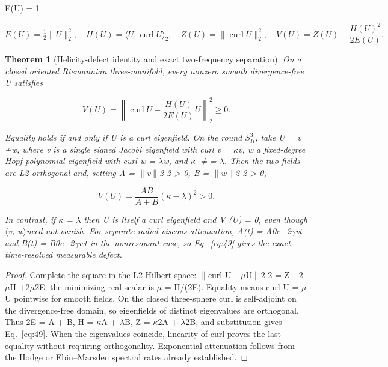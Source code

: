 \documentclass[10pt,letterpaper]{article}
\newtheorem{theorem}{Theorem}[section]
\theoremstyle{remark}
\begin{document}
E(U) = 1



\begin{equation}
\tag{47}\label{eq:47}
E(U)=\tfrac12\|U\|_2^2,\quad H(U)=\langle U,\operatorname{curl}U\rangle_2,\quad Z(U)=\|\operatorname{curl}U\|_2^2,\quad V(U)=Z(U)-\frac{H(U)^2}{2E(U)}.
\end{equation}

\begin{theorem}[Helicity-defect identity and exact two-frequency separation]

On a closed oriented Riemannian three-manifold, every nonzero smooth divergence-free U satisfies


\begin{equation}
\tag{48}\label{eq:48}
V(U)=\left\|\operatorname{curl}U-\frac{H(U)}{2E(U)}U\right\|_2^2\ge0.
\end{equation}

Equality holds if and only if U is a curl eigenfield. On the round \(S_R^3\), take U = v +w, where v is a single signed Jacobi eigenfield with curl v = \(\kappa \)v, w a fixed-degree Hopf polynomial eigenfield with curl w = \(\lambda \)w, and \(\kappa \) \(\ne \)= \(\lambda \). Then the two fields are L2-orthogonal and, setting A = \(\| \)v\(\| \)2 2 > 0, B = \(\| \)w\(\| \)2 2 > 0,



\begin{equation}
\tag{49}\label{eq:49}
V(U)=\frac{AB}{A+B}(\kappa-\lambda)^2>0.
\end{equation}

In contrast, if \(\kappa \) = \(\lambda \) then U is itself a curl eigenfield and V (U) = 0, even though \(\langle \)v, w\(\rangle \)need not vanish. For separate radial viscous attenuation, A(t) = A0e\(- \)2\(\gamma \)vt and B(t) = B0e\(- \)2\(\gamma \)wt in the nonresonant case, so Eq.~\eqref{eq:49} gives the exact time-resolved measurable defect.


\end{theorem}

\begin{proof}
Complete the square in the L2 Hilbert space: \(\| \)curl U \(- \mu \)U\(\| \)2 2 = Z \(- \)2\(\mu \)H +2\(\mu \)2E; the minimizing real scalar is \(\mu \) = H/(2E). Equality means curl U = \(\mu \)U pointwise for smooth fields. On the closed three-sphere curl is self-adjoint on the divergence-free domain, so eigenfields of distinct eigenvalues are orthogonal. Thus 2E = A + B, H = \(\kappa \)A + \(\lambda \)B, Z = \(\kappa \)2A + \(\lambda \)2B, and substitution gives Eq.~\eqref{eq:49}. When the eigenvalues coincide, linearity of curl proves the last equality without requiring orthogonality. Exponential attenuation follows from the Hodge or Ebin–Marsden spectral rates already established.

\end{proof}
\end{document}
